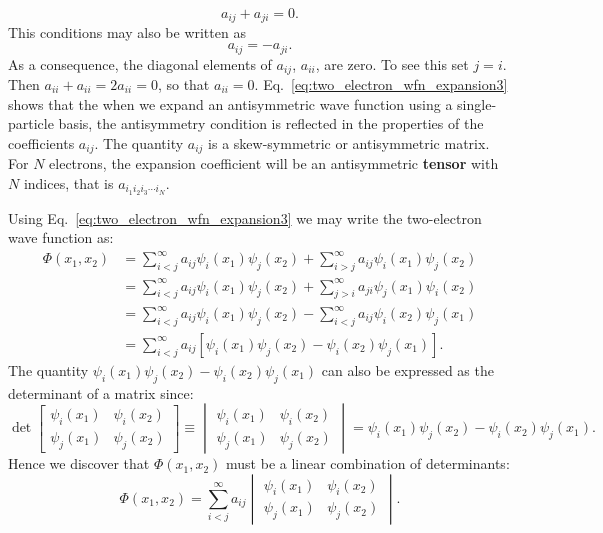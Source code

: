\documentclass[../Main/chem532-notes.tex]{subfiles}
\begin{document}
\begin{example}
\begin{equation} \label{eq:two_electron_wfn_expansion3}
a_{ij} + a_{ji} = 0.
\end{equation}
This conditions may also be written as 
\begin{equation}
a_{ij} = - a_{ji}.
\end{equation}
As a consequence, the diagonal elements of $a_{ij}$, $a_{ii}$, are zero.
To see this set $j = i$. Then $a_{ii} + a_{ii} = 2 a_{ii} = 0$, so that $a_{ii} = 0$.
Eq.~\eqref{eq:two_electron_wfn_expansion3} shows that the when we expand an antisymmetric wave function using a single-particle basis, the antisymmetry condition is reflected in the properties of the coefficients $a_{ij}$. The quantity $a_{ij}$ is a skew-symmetric or antisymmetric matrix. For $N$ electrons, the expansion coefficient will be an antisymmetric \textbf{tensor} with $N$ indices, that is $a_{i_1 i_2 i_3 \cdots i_N}$.


Using Eq.~\eqref{eq:two_electron_wfn_expansion3} we may write the two-electron wave function as:
\begin{equation}
\begin{split}
\Phi(x_1,x_2) &= \sum_{i<j}^{\infty} a_{ij} \psi_i(x_1) \psi_j(x_2) + \sum_{i>j}^{\infty} a_{ij} \psi_i(x_1) \psi_j(x_2) \\
&= \sum_{i<j}^{\infty} a_{ij} \psi_i(x_1) \psi_j(x_2) + \sum_{j>i}^{\infty} a_{ji} \psi_j(x_1) \psi_i(x_2) \\
&= \sum_{i<j}^{\infty} a_{ij} \psi_i(x_1) \psi_j(x_2) - \sum_{i<j}^{\infty} a_{ij} \psi_i(x_2) \psi_j(x_1) \\
&= \sum_{i<j}^{\infty} a_{ij} [ \psi_i(x_1) \psi_j(x_2) - \psi_i(x_2) \psi_j(x_1)].
\end{split}
\end{equation}
The quantity $\psi_i(x_1) \psi_j(x_2) - \psi_i(x_2) \psi_j(x_1)$ can also be expressed as the determinant of a matrix since:
\begin{equation}
\det
\begin{bmatrix}
\psi_i(x_1) & \psi_i(x_2) \\
\psi_j(x_1) & \psi_j(x_2) 
\end{bmatrix}
\equiv
\begin{vmatrix}
\psi_i(x_1) & \psi_i(x_2) \\
\psi_j(x_1) & \psi_j(x_2) 
\end{vmatrix}
=
\psi_i(x_1) \psi_j(x_2) - \psi_i(x_2) \psi_j(x_1).
\end{equation}
Hence we discover that $\Phi(x_1,x_2)$ must be a linear combination of determinants:
\begin{equation}
\Phi(x_1,x_2) = \sum_{i<j}^{\infty} a_{ij} 
\begin{vmatrix}
\psi_i(x_1) & \psi_i(x_2) \\
\psi_j(x_1) & \psi_j(x_2)
\end{vmatrix}.
\end{equation}
\end{example}
\end{document}
